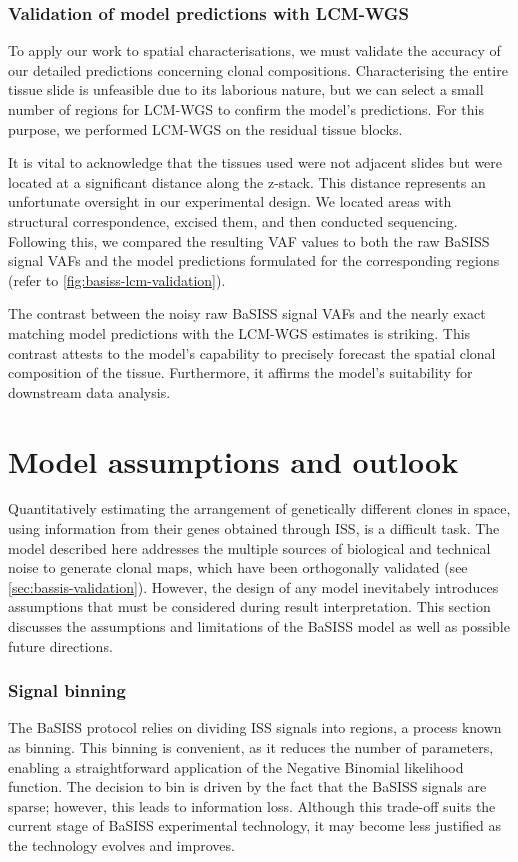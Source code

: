 \subsubsection*{Validation of model predictions with \ac{LCM}-\ac{WGS}}
To apply our work to spatial characterisations, we must validate the accuracy of our detailed predictions concerning clonal compositions. Characterising the entire tissue slide is unfeasible due to its laborious nature, but we can select a small number of regions for \ac{LCM}-\ac{WGS} to confirm the model's predictions. For this purpose, we performed \ac{LCM}-\ac{WGS} on the residual tissue blocks.

It is vital to acknowledge that the tissues used were not adjacent slides but were located at a significant distance along the z-stack. This distance represents an unfortunate oversight in our experimental design. We located areas with structural correspondence, excised them, and then conducted sequencing. Following this, we compared the resulting \ac{VAF} values to both the raw \ac{BaSISS} signal \ac{VAF}s and the model predictions formulated for the corresponding regions (refer to \cref{fig:basiss-lcm-validation}).

The contrast between the noisy raw \ac{BaSISS} signal VAFs and the nearly exact matching model predictions with the \ac{LCM}-\ac{WGS} estimates is striking. This contrast attests to the model's capability to precisely forecast the spatial clonal composition of the tissue. Furthermore, it affirms the model's suitability for downstream data analysis.

\section{Model assumptions and outlook}

Quantitatively estimating the arrangement of genetically different clones in space, using information from their genes obtained through \ac{ISS}, is a difficult task. The model described here addresses the multiple sources of biological and technical noise to generate clonal maps, which have been orthogonally validated (see \cref{sec:bassis-validation}). However, the design of any model inevitabely introduces assumptions that must be considered during result interpretation. This section discusses the assumptions and limitations of the \ac{BaSISS} model as well as possible future directions.

\subsubsection*{Signal binning}
The \ac{BaSISS} protocol relies on dividing \ac{ISS} signals into regions, a process known as binning. This binning is convenient, as it reduces the number of parameters, enabling a straightforward application of the Negative Binomial likelihood function. The decision to bin is driven by the fact that the \ac{BaSISS} signals are sparse; however, this leads to information loss. Although this trade-off suits the current stage of \ac{BaSISS} experimental technology, it may become less justified as the technology evolves and improves.

